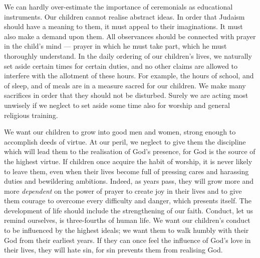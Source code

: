 We can hardly over-estimate the importance
of ceremonials as educational instruments.
Our children cannot realise abstract
ideas. In order that Judaism should have a
meaning to them, it must appeal to their
imaginations. It must also make a demand
upon them. All observances should be connected
with prayer in the child’s mind — prayer
in which he must take part, which he must
thoroughly understand. In the daily ordering
of our children’s lives, we naturally set aside
certain times for certain duties, and no other
claims are allowed to interfere with the allotment
of these hours. For example, the hours
of school, and of sleep, and of meals are in a
measure sacred for our children. We make
many sacrifices in order that they should not
be disturbed. Surely we are acting most
unwisely if we neglect to set aside some
time also for worship and general religious
training.

We want our children to grow into good
men and women, strong enough to accomplish
deeds of virtue. At our peril, we neglect
to give them the discipline which will lead
them to the realisation of God’s presence, for
God is the source of the highest virtue. If
children once acquire the habit of worship,
it is never likely to leave them, even when
their lives become full of pressing cares and
harassing duties and bewildering ambitions.
Indeed, as years pass, they will grow more
and more \textsl{dependent} on the power of prayer
to create joy in their lives and to give them
courage to overcome every difficulty and
danger, which presents itself. The development
of life should include the strengthening
of our faith. Conduct, let us remind
ourselves, is three-fourths of human life.
We want our children’s conduct to be
influenced by the highest ideals; we want
them to walk humbly with their God from
their earliest years. If they can once feel
the influence of God’s love in their lives,
they will hate sin, for sin prevents them from
realising God.


